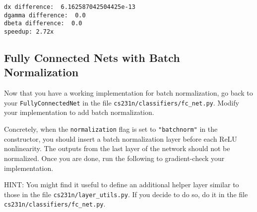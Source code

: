 \documentclass[11pt]{article}
\begin{document}
    \begin{Verbatim}[commandchars=\\\{\}]
dx difference:  6.162587042504425e-13
dgamma difference:  0.0
dbeta difference:  0.0
speedup: 2.72x
    \end{Verbatim}

    \hypertarget{fully-connected-nets-with-batch-normalization}{%
\subsection{Fully Connected Nets with Batch
Normalization}\label{fully-connected-nets-with-batch-normalization}}

Now that you have a working implementation for batch normalization, go
back to your \texttt{FullyConnectedNet} in the file
\texttt{cs231n/classifiers/fc\_net.py}. Modify your implementation to
add batch normalization.

Concretely, when the \texttt{normalization} flag is set to
\texttt{"batchnorm"} in the constructor, you should insert a batch
normalization layer before each ReLU nonlinearity. The outputs from the
last layer of the network should not be normalized. Once you are done,
run the following to gradient-check your implementation.

HINT: You might find it useful to define an additional helper layer
similar to those in the file \texttt{cs231n/layer\_utils.py}. If you
decide to do so, do it in the file
\texttt{cs231n/classifiers/fc\_net.py}.
\end{document}
